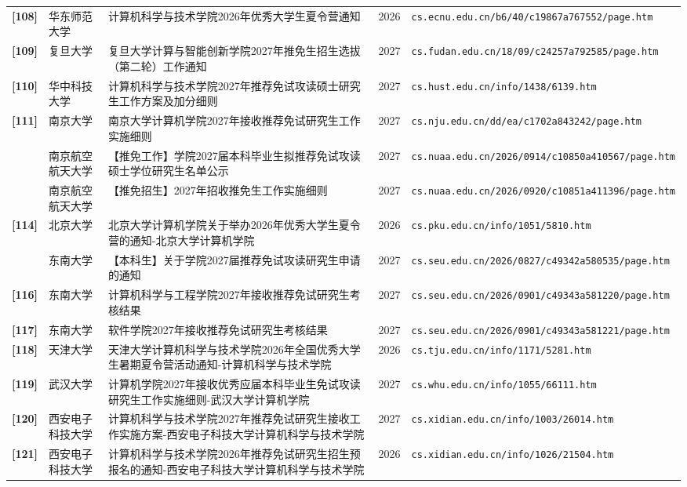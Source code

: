 {\begin{longtable}{@{}p{1.15cm}p{2.9cm}p{6.3cm}p{0.85cm}p{5.0cm}@{}}
\textbf{[108]} & 华东师范大学 & 计算机科学与技术学院2026年优秀大学生夏令营通知 & 2026 & \texttt{cs.ecnu.edu.cn/b6/40/c19867a767552/page.htm} \\
\textbf{[109]} & 复旦大学 & 复旦大学计算与智能创新学院2027年推免生招生选拔（第二轮）工作通知 & 2027 & \texttt{cs.fudan.edu.cn/18/09/c24257a792585/page.htm} \\
\textbf{[110]} & 华中科技大学 & 计算机科学与技术学院2027年推荐免试攻读硕士研究生工作方案及加分细则 & 2027 & \texttt{cs.hust.edu.cn/info/1438/6139.htm} \\
\textbf{[111]} & 南京大学 & 南京大学计算机学院2027年接收推荐免试研究生工作实施细则 & 2027 & \texttt{cs.nju.edu.cn/dd/ea/c1702a843242/page.htm} \\
[112] & 南京航空航天大学 & 【推免工作】学院2027届本科毕业生拟推荐免试攻读硕士学位研究生名单公示 & 2027 & \texttt{cs.nuaa.edu.cn/2026/0914/c10850a410567/page.htm} \\
[113] & 南京航空航天大学 & 【推免招生】2027年招收推免生工作实施细则 & 2027 & \texttt{cs.nuaa.edu.cn/2026/0920/c10851a411396/page.htm} \\
\textbf{[114]} & 北京大学 & 北京大学计算机学院关于举办2026年优秀大学生夏令营的通知-北京大学计算机学院 & 2026 & \texttt{cs.pku.edu.cn/info/1051/5810.htm} \\
[115] & 东南大学 & 【本科生】关于学院2027届推荐免试攻读研究生申请的通知 & 2027 & \texttt{cs.seu.edu.cn/2026/0827/c49342a580535/page.htm} \\
\textbf{[116]} & 东南大学 & 计算机科学与工程学院2027年接收推荐免试研究生考核结果 & 2027 & \texttt{cs.seu.edu.cn/2026/0901/c49343a581220/page.htm} \\
\textbf{[117]} & 东南大学 & 软件学院2027年接收推荐免试研究生考核结果 & 2027 & \texttt{cs.seu.edu.cn/2026/0901/c49343a581221/page.htm} \\
\textbf{[118]} & 天津大学 & 天津大学计算机科学与技术学院2026年全国优秀大学生暑期夏令营活动通知-计算机科学与技术学院 & 2026 & \texttt{cs.tju.edu.cn/info/1171/5281.htm} \\
\textbf{[119]} & 武汉大学 & 计算机学院2027年接收优秀应届本科毕业生免试攻读研究生工作实施细则-武汉大学计算机学院 & 2027 & \texttt{cs.whu.edu.cn/info/1055/66111.htm} \\
\textbf{[120]} & 西安电子科技大学 & 计算机科学与技术学院2027年推荐免试研究生接收工作实施方案-西安电子科技大学计算机科学与技术学院 & 2027 & \texttt{cs.xidian.edu.cn/info/1003/26014.htm} \\
\textbf{[121]} & 西安电子科技大学 & 计算机科学与技术学院2026年推荐免试研究生招生预报名的通知-西安电子科技大学计算机科学与技术学院 & 2026 & \texttt{cs.xidian.edu.cn/info/1026/21504.htm} \\

\end{longtable}}
